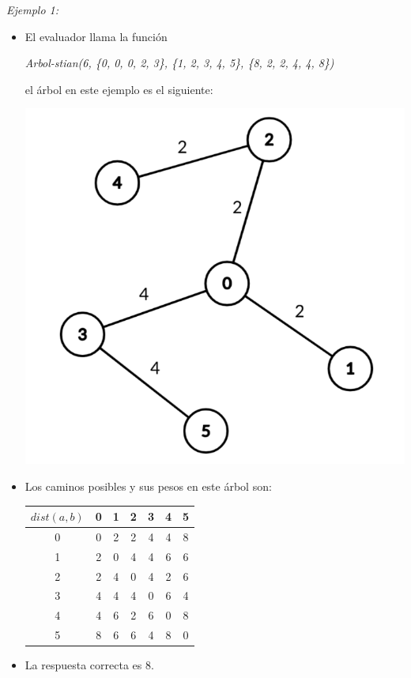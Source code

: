 \documentclass[12pt]{scrartcl}
\begin{document}
        {\itshape Ejemplo 1:}
        \begin{itemize}
            \item El evaluador llama la función 
            \begin{center}
                \textit{Arbol-stian(6, \{0, 0, 0, 2, 3\}, \{1, 2, 3, 4, 5\}, \{8, 2, 2, 4, 4, 8\})}
            \end{center}
            el árbol en este ejemplo es el siguiente:
            
            \begin{center}
                \includegraphics[scale=0.25]{ej1.png}
            \end{center}
            \item Los caminos posibles y sus pesos en este árbol son:
            \begin{center}
                \begin{tabular}{|c||c|c|c|c|c|c|}
                    \hline
                     $dist(a, b)$ & 0 & 1 & 2 & 3 & 4 & 5 \\
                     \hline
                     \hline
                     0 & 0 & 2 & 2 & 4 & 4 & 8 \\
                     \hline
                     1 & 2 & 0 & 4 & 4 & 6 & 6 \\
                     \hline
                     2 & 2 & 4 & 0 & 4 & 2 & 6 \\
                     \hline
                     3 & 4 & 4 & 4 & 0 & 6 & 4 \\
                     \hline
                     4 & 4 & 6 & 2 & 6 & 0 & 8 \\
                     \hline
                     5 & 8 & 6 & 6 & 4 & 8 & 0 \\ 
                     \hline
                \end{tabular}
            \end{center}
            \item La respuesta correcta es $8$.
        \end{itemize}
\end{document}

